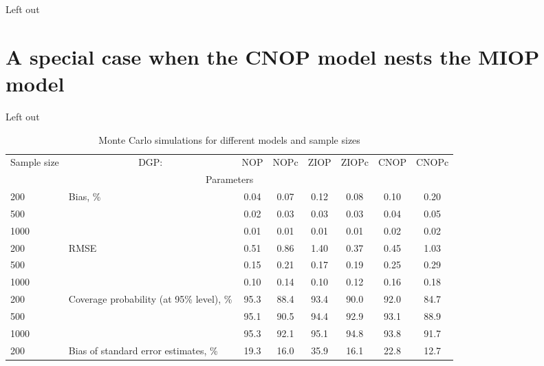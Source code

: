 \documentclass[letterpaper,fleqn,11pt]{article}
\begin{document}
Left out

\section*{\protect\Large A special case when the CNOP model nests the MIOP
model\ }

Left out


\begin{table}[htbp]
\caption{Monte Carlo simulations for different models and sample sizes}
\label{table:errors}\centering
\begin{tabular}{rrcccccc}
\toprule \toprule Sample size & \multicolumn{1}{c}{DGP:} & NOP & NOPc & ZIOP
& ZIOPc & CNOP & CNOPc \\ 
\multicolumn{8}{c}{Parameters} \\ 
\multicolumn{1}{l}{200} & \multicolumn{1}{l}{\multirow{3}[1]{*}{Bias, \%}} & 0.04  & 0.07  & 0.12  & 0.08  & 0.10  & 0.20 \\
\multicolumn{1}{l}{500} & \multicolumn{1}{l}{} & 0.02  & 0.03  & 0.03  & 0.03  & 0.04  & 0.05 \\
\multicolumn{1}{l}{1000} & \multicolumn{1}{l}{} & 0.01  & 0.01  & 0.01  & 0.01  & 0.02  & 0.02 \\
\multicolumn{1}{l}{200} & \multicolumn{1}{l}{\multirow{3}[2]{*}{RMSE}} & 0.51  & 0.86  & 1.40  & 0.37  & 0.45  & 1.03 \\
\multicolumn{1}{l}{500} & \multicolumn{1}{l}{} & 0.15  & 0.21  & 0.17  & 0.19  & 0.25  & 0.29 \\
\multicolumn{1}{l}{1000} & \multicolumn{1}{l}{} & 0.10  & 0.14  & 0.10  & 0.12  & 0.16  & 0.18 \\
\multicolumn{1}{l}{200} & \multicolumn{1}{l}{\multirow{3}[2]{4cm}{Coverage
probability (at 95\% level), \%}} & 95.3  & 88.4  & 93.4  & 90.0  & 92.0  & 84.7 \\
\multicolumn{1}{l}{500} & \multicolumn{1}{l}{} & 95.1  & 90.5  & 94.4  & 92.9  & 93.1  & 88.9 \\
\multicolumn{1}{l}{1000} & \multicolumn{1}{l}{} & 95.3  & 92.1  & 95.1  & 94.8  & 93.8  & 91.7 \\
\multicolumn{1}{l}{200} & \multicolumn{1}{l}{\multirow{3}[2]{4cm}{Bias of
standard error estimates, \%}} & 19.3  & 16.0  & 35.9  & 16.1  & 22.8  & 12.7 \\ 

\end{tabular}
\end{table}
\end{document}
